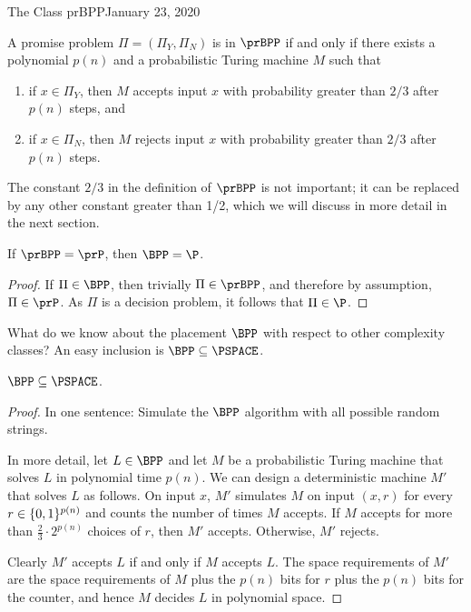 \begin{lecture}{1}{The Class prBPP}{January 23, 2020}
\begin{definition}[$\prBPP$]
  A promise problem $\Pi = (\Pi_Y, \Pi_N)$ is in $\prBPP$ if and only if there
  exists a polynomial $p(n)$ and a probabilistic Turing machine $M$ such that
  \begin{enumerate}
    \item if $x \in \Pi_Y$, then $M$ accepts input $x$ with probability greater
      than $2/3$ after $p(n)$ steps, and
    \item if $x \in \Pi_N$, then $M$ rejects input $x$ with probability greater
      than $2/3$ after $p(n)$ steps.
  \end{enumerate}
\end{definition}

The constant $2/3$ in the definition of $\prBPP$ is not important; it
can be replaced by any other constant greater than 1/2, which we will discuss
in more detail in the next section.%

\begin{proposition}
  If $\prBPP = \prP$, then $\BPP = \P$.
\end{proposition}

\begin{proof}
  If $\Pi \in \BPP$, then trivially $\Pi \in \prBPP$, and therefore by
  assumption, $\Pi \in \prP$. As $\Pi$ is a decision problem, it follows
  that $\Pi \in \P$.
\end{proof}

What do we know about the placement $\BPP$ with respect to other complexity
classes? An easy inclusion is $\BPP \subseteq \PSPACE$.

\begin{proposition}
  $\BPP \subseteq \PSPACE$.
\end{proposition}
\begin{proof}
  In one sentence: Simulate the $\BPP$ algorithm with all possible random
  strings.

  In more detail, let $L \in \BPP$ and let $M$ be a probabilistic Turing
  machine that solves $L$ in polynomial time $p(n)$. We can design a
  deterministic machine $M'$ that solves $L$ as follows. On input $x$, $M'$
  simulates $M$ on input $(x, r)$ for every $r \in \{0,1\}^{p(n)}$ and counts
  the number of times $M$ accepts. If $M$ accepts for more than $\frac{2}{3}
  \cdot 2^{p(n)}$ choices of $r$, then $M'$ accepts. Otherwise, $M'$ rejects.

  Clearly $M'$ accepts $L$ if and only if $M$ accepts $L$. The space
  requirements of $M'$ are the space requirements of $M$ plus the $p(n)$ bits
  for $r$ plus the $p(n)$ bits for the counter, and hence $M$ decides $L$ in
  polynomial space.
\end{proof}


\end{lecture}
